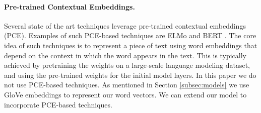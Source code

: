 \paragraph{Pre-trained Contextual Embeddings.} Several state of the art techniques leverage pre-trained contextual embeddings (PCE). Examples of such PCE-based techniques are ELMo \cite{peters2018deep} and BERT \cite{devlin2018bert}. The core idea of such techniques is to represent a piece of text using word embeddings that depend on the context in which the word appears in the text. This is typically achieved by pretraining the weights on a large-scale language modeling dataset, and using the pre-trained weights for the initial model layers.  In this paper we do not use PCE-based techniques. As mentioned in Section \ref{subsec:models} we use GloVe embeddings to represent our word vectors. We can extend our model to incorporate PCE-based techniques.  
